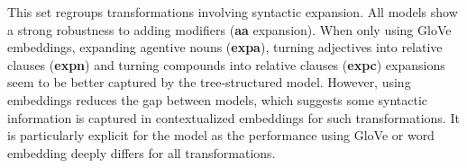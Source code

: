 This set regroups transformations involving syntactic expansion. All models show a strong robustness to adding modifiers (\textbf{aa} expansion). When only using GloVe embeddings, expanding agentive nouns (\textbf{expa}), turning adjectives into relative clauses (\textbf{expn}) and turning compounds into relative clauses (\textbf{expc}) expansions seem to be better captured by the tree-structured model. However, using \bert embeddings reduces the gap between models, which suggests some syntactic information is captured in contextualized embeddings for such transformations. It is particularly explicit for the \bow model as the performance using GloVe or \bert word embedding deeply differs for all transformations. 


